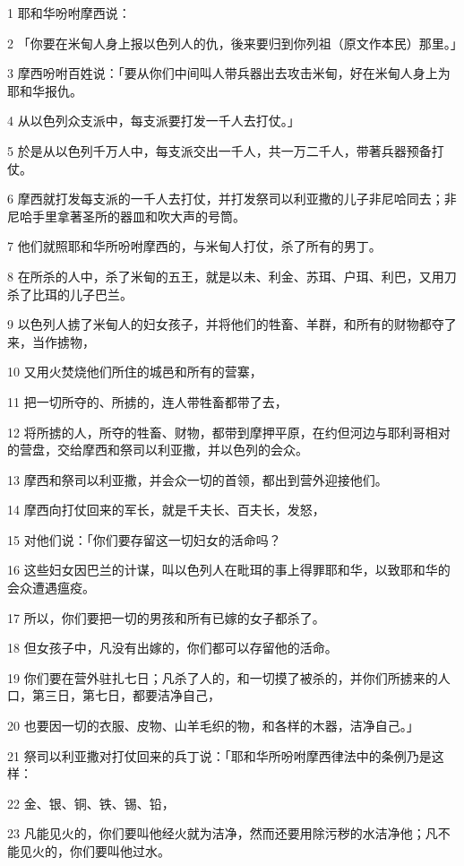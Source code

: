 \par 1 耶和华吩咐摩西说：
\par 2 「你要在米甸人身上报以色列人的仇，後来要归到你列祖（原文作本民）那里。」
\par 3 摩西吩咐百姓说：「要从你们中间叫人带兵器出去攻击米甸，好在米甸人身上为耶和华报仇。
\par 4 从以色列众支派中，每支派要打发一千人去打仗。」
\par 5 於是从以色列千万人中，每支派交出一千人，共一万二千人，带著兵器预备打仗。
\par 6 摩西就打发每支派的一千人去打仗，并打发祭司以利亚撒的儿子非尼哈同去；非尼哈手里拿著圣所的器皿和吹大声的号筒。
\par 7 他们就照耶和华所吩咐摩西的，与米甸人打仗，杀了所有的男丁。
\par 8 在所杀的人中，杀了米甸的五王，就是以未、利金、苏珥、户珥、利巴，又用刀杀了比珥的儿子巴兰。
\par 9 以色列人掳了米甸人的妇女孩子，并将他们的牲畜、羊群，和所有的财物都夺了来，当作掳物，
\par 10 又用火焚烧他们所住的城邑和所有的营寨，
\par 11 把一切所夺的、所掳的，连人带牲畜都带了去，
\par 12 将所掳的人，所夺的牲畜、财物，都带到摩押平原，在约但河边与耶利哥相对的营盘，交给摩西和祭司以利亚撒，并以色列的会众。
\par 13 摩西和祭司以利亚撒，并会众一切的首领，都出到营外迎接他们。
\par 14 摩西向打仗回来的军长，就是千夫长、百夫长，发怒，
\par 15 对他们说：「你们要存留这一切妇女的活命吗？
\par 16 这些妇女因巴兰的计谋，叫以色列人在毗珥的事上得罪耶和华，以致耶和华的会众遭遇瘟疫。
\par 17 所以，你们要把一切的男孩和所有已嫁的女子都杀了。
\par 18 但女孩子中，凡没有出嫁的，你们都可以存留他的活命。
\par 19 你们要在营外驻扎七日；凡杀了人的，和一切摸了被杀的，并你们所掳来的人口，第三日，第七日，都要洁净自己，
\par 20 也要因一切的衣服、皮物、山羊毛织的物，和各样的木器，洁净自己。」
\par 21 祭司以利亚撒对打仗回来的兵丁说：「耶和华所吩咐摩西律法中的条例乃是这样：
\par 22 金、银、铜、铁、锡、铅，
\par 23 凡能见火的，你们要叫他经火就为洁净，然而还要用除污秽的水洁净他；凡不能见火的，你们要叫他过水。
